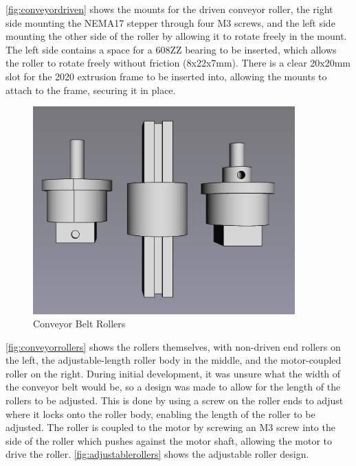 \autoref{fig:conveyordriven} shows the mounts for the driven conveyor roller, the right side mounting the NEMA17 stepper through four M3 screws, and the left side mounting the other side of the roller by allowing it to rotate freely in the mount. The left side contains a space for a 608ZZ bearing to be inserted, which allows the roller to rotate freely without friction (8x22x7mm). There is a clear 20x20mm slot for the 2020 extrusion frame to be inserted into, allowing the mounts to attach to the frame, securing it in place. 

\begin{figure}[H]
    \begin{minipage}[h]{0.95\textwidth}
        \centering
        \includegraphics[height=8cm]{imgs/freecad/rollers.jpg}
        \caption{Conveyor Belt Rollers}
        \label{fig:conveyorrollers}
    \end{minipage}
\end{figure}

\autoref{fig:conveyorrollers} shows the rollers themselves, with non-driven end rollers on the left, the adjustable-length roller body in the middle, and the motor-coupled roller on the right. During initial development, it was unsure what the width of the conveyor belt would be, so a design was made to allow for the length of the rollers to be adjusted. This is done by using a screw on the roller ends to adjust where it locks onto the roller body, enabling the length of the roller to be adjusted. The roller is coupled to the motor by screwing an M3 screw into the side of the roller which pushes against the motor shaft, allowing the motor to drive the roller. \autoref{fig:adjustablerollers} shows the adjustable roller design.

